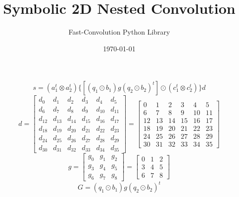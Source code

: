 \documentclass{article}%
\title{Symbolic 2D Nested Convolution}%
\author{Fast{-}Convolution Python Library}%
\date{\today}%
\begin{document}
%
\normalsize%
\maketitle%
\[%
s=(a_1^t \otimes a_2^t) \{[(q_1 \odot b_1) g (q_2 \odot b_2)^t] \odot (c_1^t \otimes c_2^t)\} d%
\]%
\[%
d = \left[\begin{matrix}d_{0} & d_{1} & d_{2} & d_{3} & d_{4} & d_{5}\\d_{6} & d_{7} & d_{8} & d_{9} & d_{10} & d_{11}\\d_{12} & d_{13} & d_{14} & d_{15} & d_{16} & d_{17}\\d_{18} & d_{19} & d_{20} & d_{21} & d_{22} & d_{23}\\d_{24} & d_{25} & d_{26} & d_{27} & d_{28} & d_{29}\\d_{30} & d_{31} & d_{32} & d_{33} & d_{34} & d_{35}\end{matrix}\right] = \left[\begin{matrix}0 & 1 & 2 & 3 & 4 & 5\\6 & 7 & 8 & 9 & 10 & 11\\12 & 13 & 14 & 15 & 16 & 17\\18 & 19 & 20 & 21 & 22 & 23\\24 & 25 & 26 & 27 & 28 & 29\\30 & 31 & 32 & 33 & 34 & 35\end{matrix}\right]%
\]%
\[%
g = \left[\begin{matrix}g_{0} & g_{1} & g_{2}\\g_{3} & g_{4} & g_{5}\\g_{6} & g_{7} & g_{8}\end{matrix}\right] = \left[\begin{matrix}0 & 1 & 2\\3 & 4 & 5\\6 & 7 & 8\end{matrix}\right]%
\]%
\[%
G = (q_1 \odot b_1) g (q_2 \odot b_2)^t%
\]%
\end{document}
